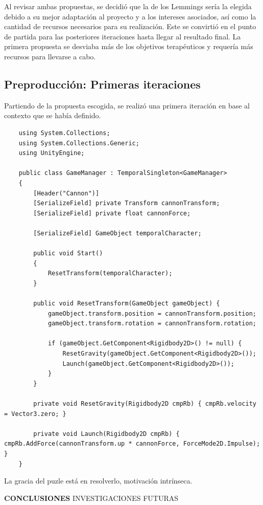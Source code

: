 Al revisar ambas propuestas, se decidió que la de los Lemmings sería la elegida debido a su mejor adaptación al proyecto y a los intereses asociados, así como la cantidad de recursos necesarios para su realización. Este se convirtió en el punto de partida para las posteriores iteraciones hasta llegar al resultado final. La primera propuesta se desviaba más de los objetivos terapéuticos y requería más recursos para llevarse a cabo.

\subsection{Preproducción: Primeras iteraciones}

Partiendo de la propuesta escogida, se realizó una primera iteración en base al contexto que se había definido.

\begin{lstlisting}
	using System.Collections;
	using System.Collections.Generic;
	using UnityEngine;
	
	public class GameManager : TemporalSingleton<GameManager>
	{
		[Header("Cannon")]
		[SerializeField] private Transform cannonTransform;
		[SerializeField] private float cannonForce;
		
		[SerializeField] GameObject temporalCharacter;
		
		public void Start()
		{
			ResetTransform(temporalCharacter);
		}
		
		public void ResetTransform(GameObject gameObject) {
			gameObject.transform.position = cannonTransform.position;
			gameObject.transform.rotation = cannonTransform.rotation;
			
			if (gameObject.GetComponent<Rigidbody2D>() != null) { 
				ResetGravity(gameObject.GetComponent<Rigidbody2D>());
				Launch(gameObject.GetComponent<Rigidbody2D>()); 
			}
		}
		
		private void ResetGravity(Rigidbody2D cmpRb) { cmpRb.velocity = Vector3.zero; }
		
		private void Launch(Rigidbody2D cmpRb) { cmpRb.AddForce(cannonTransform.up * cannonForce, ForceMode2D.Impulse); }
	}
\end{lstlisting}

La gracia del puzle está en resolverlo, motivación intrínseca.

\textbf{CONCLUSIONES}
INVESTIGACIONES FUTURAS